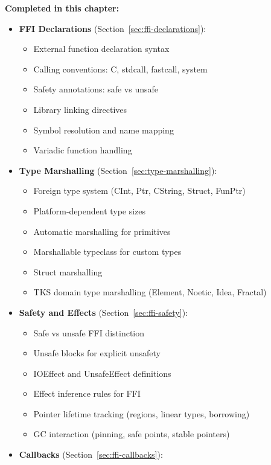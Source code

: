 \begin{tcolorbox}[colback=green!5!white,colframe=green!50!black,title=\textbf{COMPILER-TASK-07 Complete: FFI Chapter},breakable]
\textbf{Completed in this chapter:}
\begin{itemize}
  \item \textbf{FFI Declarations} (Section~\ref{sec:ffi-declarations}):
    \begin{itemize}
      \item External function declaration syntax
      \item Calling conventions: C, stdcall, fastcall, system
      \item Safety annotations: safe vs unsafe
      \item Library linking directives
      \item Symbol resolution and name mapping
      \item Variadic function handling
    \end{itemize}
  \item \textbf{Type Marshalling} (Section~\ref{sec:type-marshalling}):
    \begin{itemize}
      \item Foreign type system (CInt, Ptr, CString, Struct, FunPtr)
      \item Platform-dependent type sizes
      \item Automatic marshalling for primitives
      \item Marshallable typeclass for custom types
      \item Struct marshalling
      \item TKS domain type marshalling (Element, Noetic, Idea, Fractal)
    \end{itemize}
  \item \textbf{Safety and Effects} (Section~\ref{sec:ffi-safety}):
    \begin{itemize}
      \item Safe vs unsafe FFI distinction
      \item Unsafe blocks for explicit unsafety
      \item IOEffect and UnsafeEffect definitions
      \item Effect inference rules for FFI
      \item Pointer lifetime tracking (regions, linear types, borrowing)
      \item GC interaction (pinning, safe points, stable pointers)
    \end{itemize}
  \item \textbf{Callbacks} (Section~\ref{sec:ffi-callbacks}):

\end{itemize}
\end{tcolorbox}
